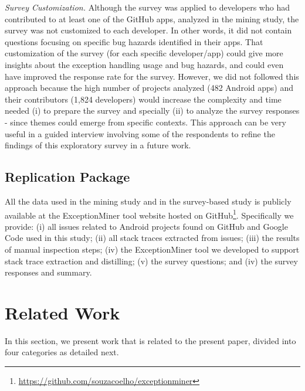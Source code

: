 {\emph{Survey Customization.} Although the survey was applied to developers who had contributed to at least one of the GitHub apps, analyzed in the mining study, the survey was not customized to each developer. In other words, it did not contain questions focusing on specific bug hazards identified in their apps. That customization of the survey (for each specific developer/app) could give more insights about the exception handling usage and bug hazards, and could even have improved the response rate for the survey. However, we did not followed this approach because the high number of projects analyzed (482 Android apps) and their contributors (1,824 developers) would increase the complexity and time needed (i) to prepare the survey and specially (ii) to analyze the survey responses - since themes could emerge from specific contexts. This approach can be very useful in a guided interview involving some of the respondents to refine the findings of this exploratory survey in a future work.





\subsection{Replication Package}
All the data used in the mining study and in the survey-based study is publicly
available at the ExceptionMiner tool website hosted on GitHub\footnote{\url{https://github.com/souzacoelho/exceptionminer}}.
Specifically we provide: (i) all issues related to Android projects found
on GitHub and Google Code used in this study; (ii) all stack traces extracted
from issues; (iii) the results of manual inspection steps; (iv) the
ExceptionMiner tool we developed to support stack trace extraction and distilling;
(v) the survey questions; and (iv) the survey responses and summary.

\section{Related Work}
\label{sec:rele}

In this section, we present work that is related to the present paper, divided into
four categories as detailed next.

}
